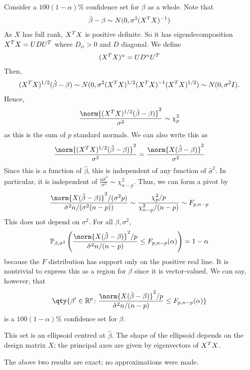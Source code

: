 \begin{example}
	Consider a $100(1-\alpha)\%$ confidence set for $\beta$ as a whole.
	Note that
	\begin{align*}
		\hat \beta - \beta \sim N(0,\sigma^2 (X^T X)^{-1})
	\end{align*}
	As $X$ has full rank, $X^T X$ is positive definite.
	So it has eigendecomposition $X^T X = U D U^T$ where $D_{ii} > 0$ and $D$ diagonal.
	We define
	\begin{align*}
		(X^T X)^\alpha = U D^\alpha U^T
	\end{align*} 
	Then,
	\begin{align*}
		(X^T X)^{1/2} (\hat \beta - \beta) \sim N(0,\sigma^2(X^T X)^{1/2} (X^T X)^{-1} (X^T X)^{1/2}) \sim N(0,\sigma^2 I).
	\end{align*}
	Hence,
	\begin{align*}
		\frac{\norm{(X^\tran X)^{1/2} (\hat \beta - \beta)}^2}{\sigma^2} \sim \chi^2_p
	\end{align*} as this is the sum of $p$ standard normals.
	We can also write this as
	\begin{align*}
		\frac{\norm{(X^\tran X)^{1/2} (\hat \beta - \beta)}^2}{\sigma^2} = \frac{\norm{X(\hat \beta - \beta)}^2}{\sigma^2}
	\end{align*}
	Since this is a function of $\hat \beta$, this is independent of any function of $\hat \sigma^2$.
	In particular, it is independent of $\frac{n\hat\sigma^2}{\sigma^2} \sim \chi^2_{n-p}$.
	Thus, we can form a pivot by
	\begin{align*}
		\frac{\norm{X(\hat \beta - \beta)}^2 / (\sigma^2 p)}{\hat\sigma^2 n / (\sigma^2(n-p))} \sim \frac{\chi^2_p / p}{\chi^2_{n-p} / (n-p)} \sim F_{p,n-p}
	\end{align*}
	This does not depend on $\sigma^2$.
	For all $\beta, \sigma^2$,
	\begin{align*}
		\psub{\beta,\sigma^2}{
			\frac{\norm{X(\hat \beta - \beta)}^2 / p}{\hat\sigma^2 n / (n-p)}
			\leq F_{p,n-p}(\alpha)} = 1-\alpha
	\end{align*}
	because the $F$ distribution has support only on the positive real line.
	It is nontrivial to express this as a region for $\beta$ since it is vector-valued.
	We can say, however, that
	\begin{align*}
		\qty{\beta' \in \mathbb R^p \colon \frac{\norm{X(\hat \beta - \beta)}^2/p}{\hat \sigma^2 n/(n-p)} \leq F_{p,n-p}(\alpha)}
	\end{align*}
	is a $100(1-\alpha)\%$ confidence set for $\beta$.

	This set is an ellipsoid centred at $\hat \beta$.
	The shape of the ellipsoid depends on the design matrix $X$; the principal axes are given by eigenvectors of $X^T X$.
\end{example}
The above two results are exact; no approximations were made.

